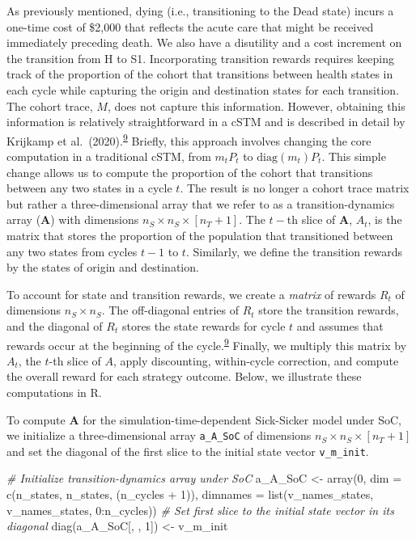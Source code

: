 \documentclass[
]{article}
\newenvironment{Shaded}{\begin{snugshade}}{\end{snugshade}}
\newcommand{\AttributeTok}[1]{\textcolor[rgb]{0.77,0.63,0.00}{#1}}
\newcommand{\CommentTok}[1]{\textcolor[rgb]{0.56,0.35,0.01}{\textit{#1}}}
\newcommand{\DecValTok}[1]{\textcolor[rgb]{0.00,0.00,0.81}{#1}}
\newcommand{\FunctionTok}[1]{\textcolor[rgb]{0.00,0.00,0.00}{#1}}
\newcommand{\NormalTok}[1]{#1}
\newcommand{\OtherTok}[1]{\textcolor[rgb]{0.56,0.35,0.01}{#1}}
\newcommand{\SpecialCharTok}[1]{\textcolor[rgb]{0.00,0.00,0.00}{#1}}
\begin{document}
As previously mentioned, dying (i.e., transitioning to the Dead state) incurs a one-time cost of \$2,000 that reflects the acute care that might be received immediately preceding death. We also have a disutility and a cost increment on the transition from H to S1. Incorporating transition rewards requires keeping track of the proportion of the cohort that transitions between health states in each cycle while capturing the origin and destination states for each transition. The cohort trace, \(M\), does not capture this information. However, obtaining this information is relatively straightforward in a cSTM and is described in detail by Krijkamp et al.~(2020).\textsuperscript{\protect\hyperlink{ref-Krijkamp2019}{9}} Briefly, this approach involves changing the core computation in a traditional cSTM, from \(m_t P_t\) to \(\text{diag}(m_t) P_t\). This simple change allows us to compute the proportion of the cohort that transitions between any two states in a cycle \(t\). The result is no longer a cohort trace matrix but rather a three-dimensional array that we refer to as a transition-dynamics array (\(\mathbf{A}\)) with dimensions \(n_S \times n_S \times [n_T+1]\). The \(t-\)th slice of \(\mathbf{A}\), \(A_t\), is the matrix that stores the proportion of the population that transitioned between any two states from cycles \(t-1\) to \(t\). Similarly, we define the transition rewards by the states of origin and destination.

To account for state and transition rewards, we create a \emph{matrix} of rewards \(R_t\) of dimensions \(n_S \times n_S\). The off-diagonal entries of \(R_t\) store the transition rewards, and the diagonal of \(R_t\) stores the state rewards for cycle \(t\) and assumes that rewards occur at the beginning of the cycle.\textsuperscript{\protect\hyperlink{ref-Krijkamp2019}{9}} Finally, we multiply this matrix by \(A_t\), the \(t\)-th slice of \(A\), apply discounting, within-cycle correction, and compute the overall reward for each strategy outcome. Below, we illustrate these computations in R.

To compute \(\mathbf{A}\) for the simulation-time-dependent Sick-Sicker model under SoC, we initialize a three-dimensional array \texttt{a\_A\_SoC} of dimensions \(n_S \times n_S \times [n_T+1]\) and set the diagonal of the first slice to the initial state vector \texttt{v\_m\_init}.

\begin{Shaded}
\begin{Highlighting}[]
\CommentTok{\# Initialize transition{-}dynamics array under SoC}
\NormalTok{a\_A\_SoC }\OtherTok{\textless{}{-}} \FunctionTok{array}\NormalTok{(}\DecValTok{0}\NormalTok{,}
             \AttributeTok{dim =} \FunctionTok{c}\NormalTok{(n\_states, n\_states, (n\_cycles }\SpecialCharTok{+} \DecValTok{1}\NormalTok{)),}
             \AttributeTok{dimnames =} \FunctionTok{list}\NormalTok{(v\_names\_states, v\_names\_states, }\DecValTok{0}\SpecialCharTok{:}\NormalTok{n\_cycles))}
\CommentTok{\# Set first slice to the initial state vector in its diagonal}
\FunctionTok{diag}\NormalTok{(a\_A\_SoC[, , }\DecValTok{1}\NormalTok{]) }\OtherTok{\textless{}{-}}\NormalTok{ v\_m\_init}
\end{Highlighting}
\end{Shaded}
\end{document}
